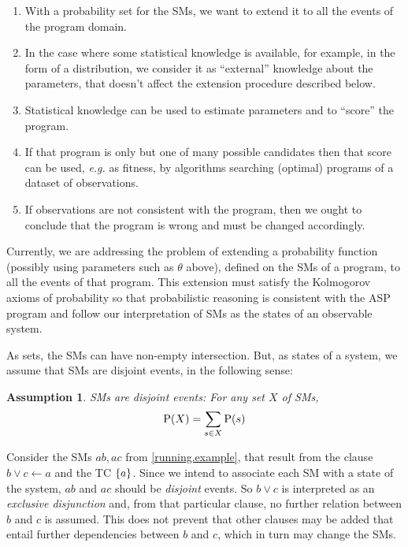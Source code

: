\documentclass{llncs}
\newtheorem{assumption}{Assumption}
\newcommand{\at}[1]{\ensuremath{\!\del{#1}}}
\newcommand{\pr}[1]{\ensuremath{\mathrm{P}\at{#1}}}
\begin{document}
\begin{enumerate}

    \item With a probability set for the \aclp{SM}, we want to extend it to all the events of the program domain.

    \item In the case where some statistical knowledge is available, for example, in the form of a distribution, we consider it as ``external'' knowledge about the parameters, that doesn't affect the extension procedure described below.

    \item Statistical knowledge can be used to estimate parameters and to ``score'' the program.

    \item\label{item:program.selection} If that program is only but one of many possible candidates then that score can be used, \emph{e.g.} as fitness, by algorithms searching (optimal) programs of a dataset of observations.

    \item  If observations are not consistent with the program, then we ought to conclude that the program is wrong and must be changed accordingly.
\end{enumerate}

Currently, we are addressing the problem of extending a probability function (possibly using parameters such as $\theta$ above), defined on the \acp{SM} of a program, to all the events of that program. This extension must satisfy the Kolmogorov axioms of probability so that probabilistic reasoning is consistent with the \ac{ASP} program and follow our interpretation of \aclp{SM} as the states of an observable system.

As sets, the \acp{SM} can have non-empty intersection. But, as states of a system, we assume that \acp{SM} are disjoint events, in the following sense:

\begin{assumption}\label{assumption:smodels.disjoint}
    \Aclp{SM} are disjoint events: For any set $X$ of \aclp{SM},
    \begin{equation}
        \pr{X} = \sum_{s\in X}\pr{s}
    \end{equation}
\end{assumption}

Consider the \aclp{SM} $ab, ac$ from \cref{running.example}, that result from the clause $b \vee c \leftarrow a$ and the \acl{TC} $\set{a}$. Since we intend to associate each \acl{SM} with a state of the system, $ab$ and $ac$ should be \emph{disjoint} events. So $b \vee c$ is interpreted as an \emph{exclusive disjunction} and, from that particular clause, no further relation between $b$ and $c$ is assumed. This does not prevent that other clauses may be added that entail further dependencies between $b$ and $c$, which in turn may change the \aclp{SM}.
\end{document}
